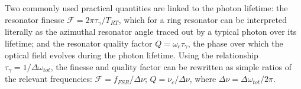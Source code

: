    Two commonly used practical quantities are linked to the photon lifetime: the resonator finesse $\mathcal{F}=2\pi\tau_\gamma/T_{RT}$, which for a ring resonator can be interpreted literally as the azimuthal resonator angle traced out by a typical photon over its lifetime; and the resonator quality factor $Q=\omega_c \tau_\gamma$, the phase over which the optical field evolves during the photon lifetime. Using the relationship $\tau_\gamma=1/\Delta\omega_{tot}$, the finesse and quality factor can be rewritten as simple ratios of the relevant frequencies: $\mathcal{F}=f_{FSR}/\Delta\nu$; $Q=\nu_c/\Delta\nu$, where $\Delta\nu=\Delta\omega_{tot}/2\pi$.
   
   
  
 
 
% 
% 
%
%
